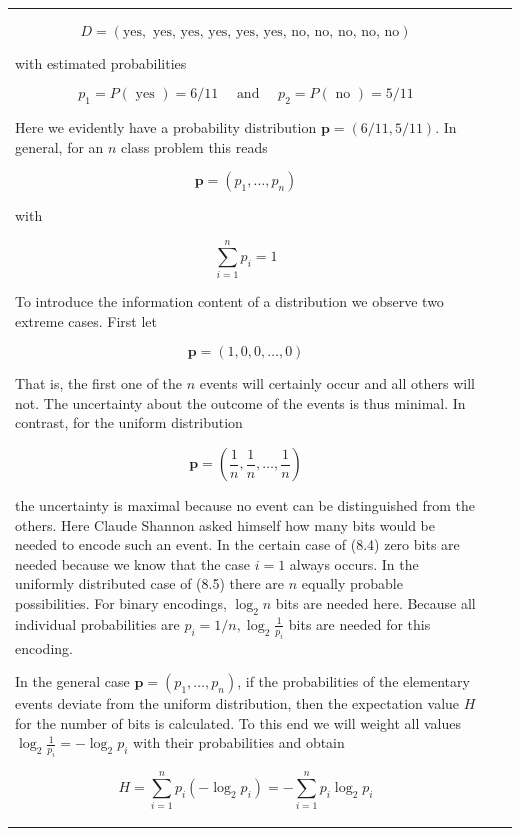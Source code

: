 \documentclass[10pt]{book}
\begin{document}
\begin{center}
\begin{tabular}{|l|l|l|}
$$
D=(\text{yes}, \text{ yes, yes, yes, yes, yes, no, no, no, no, no})
$$

with estimated probabilities

$$
p_{1}=P(\text{ yes })=6 / 11 \quad \text { and } \quad p_{2}=P(\text{ no })=5 / 11
$$

Here we evidently have a probability distribution $\boldsymbol{p}=(6 / 11,5 / 11)$. In general, for an $n$ class problem this reads

$$
\boldsymbol{p}=\left(p_{1}, \ldots, p_{n}\right)
$$

with

$$
\sum_{i=1}^{n} p_{i}=1
$$

To introduce the information content of a distribution we observe two extreme cases. First let

\begin{equation*}
\boldsymbol{p}=(1,0,0, \ldots, 0) \tag{8.4}
\end{equation*}

That is, the first one of the $n$ events will certainly occur and all others will not. The uncertainty about the outcome of the events is thus minimal. In contrast, for the uniform distribution

\begin{equation*}
\boldsymbol{p}=\left(\frac{1}{n}, \frac{1}{n}, \ldots, \frac{1}{n}\right) \tag{8.5}
\end{equation*}

the uncertainty is maximal because no event can be distinguished from the others. Here Claude Shannon asked himself how many bits would be needed to encode such an event. In the certain case of (8.4) zero bits are needed because we know that the case $i=1$ always occurs. In the uniformly distributed case of (8.5) there are $n$ equally probable possibilities. For binary encodings, $\log _{2} n$ bits are needed here. Because all individual probabilities are $p_{i}=1 / n, \log _{2} \frac{1}{p_{i}}$ bits are needed for this encoding.

In the general case $\boldsymbol{p}=\left(p_{1}, \ldots, p_{n}\right)$, if the probabilities of the elementary events deviate from the uniform distribution, then the expectation value $H$ for the number of bits is calculated. To this end we will weight all values $\log _{2} \frac{1}{p_{i}}=-\log _{2} p_{i}$ with their probabilities and obtain

$$
H=\sum_{i=1}^{n} p_{i}\left(-\log _{2} p_{i}\right)=-\sum_{i=1}^{n} p_{i} \log _{2} p_{i}
$$


\end{tabular}
\end{center}
\end{document}
